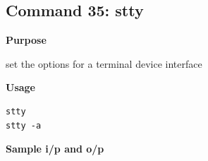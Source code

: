 \subsection{Command 35: stty} 
\textbf{Purpose}
\begin{flushleft}
 set the options for a terminal device interface
\end{flushleft}
\textbf{Usage}
\begin{verbatim}
stty
stty -a
\end{verbatim}
\textbf{Sample i/p and o/p}
\begin{figure}[H] 
\end{figure}
